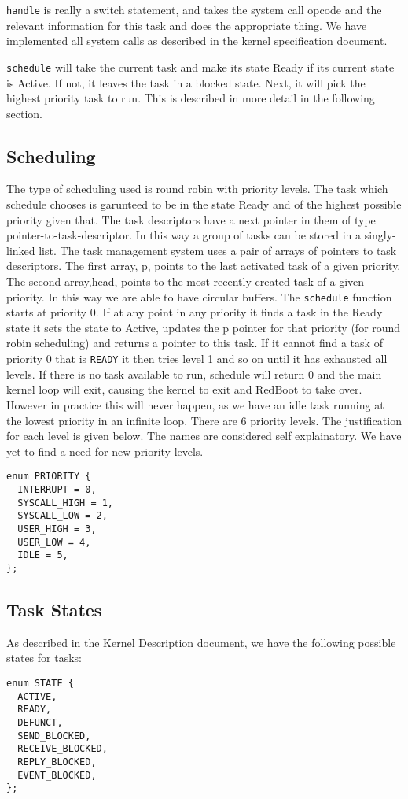 \documentclass{article}
\begin{document}
\texttt{handle} is really a switch statement, and takes the system call opcode
and the relevant information for this task and does the appropriate thing. We
have implemented all system calls as described in the kernel specification
document. 

\texttt{schedule} will take the current task and make its state Ready if
its current state is Active. If not, it leaves the task in a blocked state.
Next, it will pick the highest priority task to run. This is described in more
detail in the following section. 

\subsection{Scheduling}
The type of scheduling used is round robin with priority levels. The task which
schedule chooses is garunteed to be in the state Ready and of the highest
possible priority given that. The task descriptors have a next pointer in them
of type pointer-to-task-descriptor. In this way a group of tasks can be stored
in a singly-linked list. The task management system uses a pair of arrays of
pointers to task descriptors. The first array, p, points to the last activated
task of a given priority. The second array,head, points to the most recently
created task of a given priority. In this way we are able to have circular
buffers. The \texttt{schedule} function starts at priority 0. If at any point in
any priority it finds a task in the Ready state it sets the state to Active,
updates the p pointer for that priority (for round robin scheduling) and returns
a pointer to this task. If it cannot find a task of priority 0 that is
\texttt{READY} it then tries level 1 and so on until it has exhausted all
levels. If there is no task available to run, schedule will return 0 and the
main kernel loop will exit, causing the kernel to exit and RedBoot to take over.
However in practice this will never happen, as we have an idle task running at
the lowest priority in an infinite loop. There are 6 priority levels. The
justification for each level is given below. The names are considered self
explainatory. We have yet to find a need for new priority levels.
\begin{verbatim}
enum PRIORITY { 
  INTERRUPT = 0, 
  SYSCALL_HIGH = 1, 
  SYSCALL_LOW = 2, 
  USER_HIGH = 3, 
  USER_LOW = 4, 
  IDLE = 5, 
};
\end{verbatim}

\subsection{Task States}
As described in the Kernel Description document, we have the following possible
states for tasks:
\begin{verbatim}
enum STATE {
  ACTIVE,
  READY,
  DEFUNCT,
  SEND_BLOCKED,
  RECEIVE_BLOCKED,
  REPLY_BLOCKED,
  EVENT_BLOCKED,
};
\end{verbatim}
\end{document}
